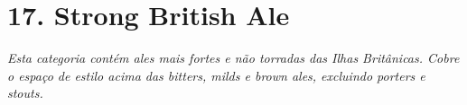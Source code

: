 \section*{17. Strong British Ale}
\textit{Esta categoria contém ales mais fortes e não torradas das Ilhas Britânicas. Cobre o espaço de estilo acima das bitters, milds e brown ales, excluindo porters e stouts.}
